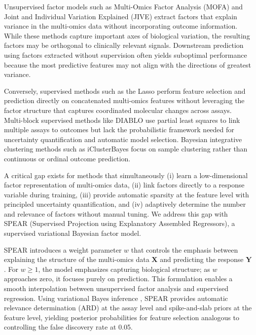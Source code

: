 \documentclass[11pt]{article}
\begin{document}
Unsupervised factor models such as Multi-Omics Factor Analysis (MOFA) \citep{argelaguet2018mofa} and Joint and Individual Variation Explained (JIVE) \citep{lock2013jive} extract factors that explain variance in the multi-omics data without incorporating outcome information. While these methods capture important axes of biological variation, the resulting factors may be orthogonal to clinically relevant signals. Downstream prediction using factors extracted without supervision often yields suboptimal performance because the most predictive features may not align with the directions of greatest variance.

Conversely, supervised methods such as the Lasso \citep{tibshirani1996lasso} perform feature selection and prediction directly on concatenated multi-omics features without leveraging the factor structure that captures coordinated molecular changes across assays. Multi-block supervised methods like DIABLO \citep{singh2019diablo} use partial least squares to link multiple assays to outcomes but lack the probabilistic framework needed for uncertainty quantification and automatic model selection. Bayesian integrative clustering methods such as iClusterBayes \citep{mo2018iclusterbayes} focus on sample clustering rather than continuous or ordinal outcome prediction.

A critical gap exists for methods that simultaneously (i) learn a low-dimensional factor representation of multi-omics data, (ii) link factors directly to a response variable during training, (iii) provide automatic sparsity at the feature level with principled uncertainty quantification, and (iv) adaptively determine the number and relevance of factors without manual tuning. We address this gap with SPEAR (Supervised Projection using Explanatory Assembled Regressors), a supervised variational Bayesian factor model.

SPEAR introduces a weight parameter $w$ that controls the emphasis between explaining the structure of the multi-omics data $\mathbf{X}$ and predicting the response $\mathbf{Y}$. For $w \geq 1$, the model emphasizes capturing biological structure; as $w$ approaches zero, it focuses purely on prediction. This formulation enables a smooth interpolation between unsupervised factor analysis and supervised regression. Using variational Bayes inference \citep{blei2017variational}, SPEAR provides automatic relevance determination (ARD) \citep{mackay1995ard, tipping2001sparse} at the assay level and spike-and-slab priors \citep{george1993spike} at the feature level, yielding posterior probabilities for feature selection analogous to controlling the false discovery rate at 0.05.
\end{document}
